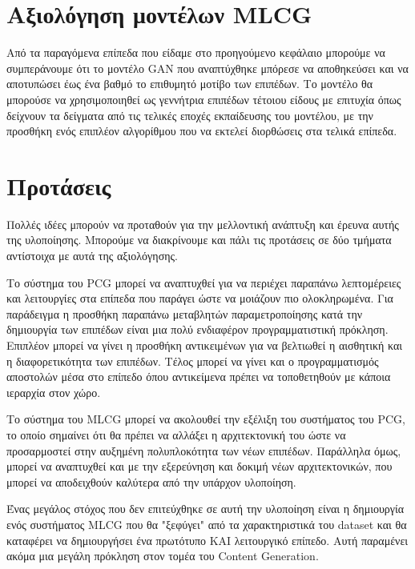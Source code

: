 \section{Αξιολόγηση μοντέλων MLCG}
\par
Από τα παραγόμενα επίπεδα που είδαμε στο προηγούμενο κεφάλαιο μπορούμε να συμπεράνουμε ότι το μοντέλο GAN που αναπτύχθηκε μπόρεσε να αποθηκεύσει και να αποτυπώσει έως ένα βαθμό το επιθυμητό μοτίβο των επιπέδων. Το μοντέλο θα μπορούσε να χρησιμοποιηθεί ως γεννήτρια επιπέδων τέτοιου είδους με επιτυχία όπως δείχνουν τα δείγματα από τις τελικές εποχές εκπαίδευσης του μοντέλου, με την προσθήκη ενός επιπλέον αλγορίθμου που να εκτελεί διορθώσεις στα τελικά επίπεδα.


\section{Προτάσεις}
\par
Πολλές ιδέες μπορούν να προταθούν για την μελλοντική ανάπτυξη και έρευνα αυτής της υλοποίησης. Μπορούμε να διακρίνουμε και πάλι τις προτάσεις σε δύο τμήματα  αντίστοιχα με αυτά της αξιολόγησης.
\par
Το σύστημα του PCG μπορεί να αναπτυχθεί για να περιέχει παραπάνω λεπτομέρειες και λειτουργίες στα επίπεδα που παράγει ώστε να μοιάζουν πιο ολοκληρωμένα. Για παράδειγμα η προσθήκη παραπάνω μεταβλητών παραμετροποίησης κατά την δημιουργία των επιπέδων είναι μια πολύ ενδιαφέρον προγραμματιστική πρόκληση. Επιπλέον μπορεί να γίνει η προσθήκη αντικειμένων για να βελτιωθεί η αισθητική και η διαφορετικότητα των επιπέδων. Τέλος μπορεί να γίνει και ο προγραμματισμός αποστολών μέσα στο επίπεδο όπου αντικείμενα πρέπει να τοποθετηθούν με κάποια ιεραρχία στον χώρο.
\par
Το σύστημα του MLCG μπορεί να ακολουθεί την εξέλιξη του συστήματος του PCG, το οποίο σημαίνει ότι θα πρέπει να αλλάξει η αρχιτεκτονική του ώστε να προσαρμοστεί στην αυξημένη πολυπλοκότητα των νέων επιπέδων. Παράλληλα όμως, μπορεί να αναπτυχθεί και με την εξερεύνηση και δοκιμή νέων αρχιτεκτονικών, που μπορεί να αποδειχθούν καλύτερα από την υπάρχον υλοποίηση.
\par
Ένας μεγάλος στόχος που δεν επιτεύχθηκε σε αυτή την υλοποίηση είναι η δημιουργία ενός συστήματος MLCG που θα "ξεφύγει" από τα χαρακτηριστικά του dataset και θα καταφέρει να δημιουργήσει ένα πρωτότυπο ΚΑΙ λειτουργικό επίπεδο. Αυτή παραμένει ακόμα μια μεγάλη πρόκληση στον τομέα του Content Generation.









